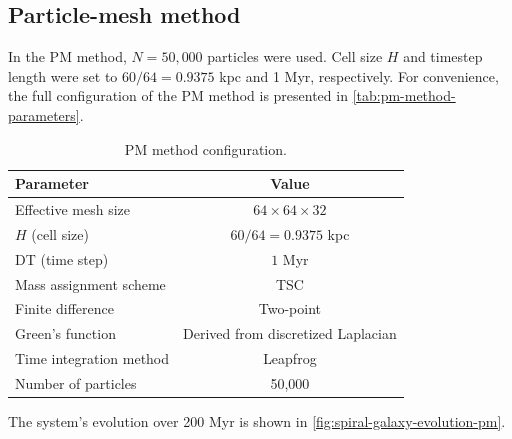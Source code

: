 \subsection{Particle-mesh method}
In the PM method, $N=50{,}000$ particles were used.
Cell size $H$ and timestep length were set to $60/64=0.9375$ kpc and 1 Myr, respectively.
For convenience, the full configuration of the PM method is presented in \autoref{tab:pm-method-parameters}.
\begin{table}[htp]
    \centering
    \caption{PM method configuration.}
    \label{tab:pm-method-parameters}
    \begin{tabular}{lc}
        \midrule
        \textbf{Parameter}      & \textbf{Value}                     \\
        \hline
        Effective mesh size     & $64 \times 64 \times 32$           \\
        $H$ (cell size)         & $60/64=0.9375$ kpc                 \\
        DT (time step)          & $1$ Myr                            \\
        Mass assignment scheme  & TSC                                \\
        Finite difference       & Two-point                          \\
        Green's function        & Derived from discretized Laplacian \\
        Time integration method & Leapfrog                           \\
        Number of particles     & 50,000                             \\
        \bottomrule
    \end{tabular}
\end{table}
The system's evolution over 200 Myr is shown in \autoref{fig:spiral-galaxy-evolution-pm}.

